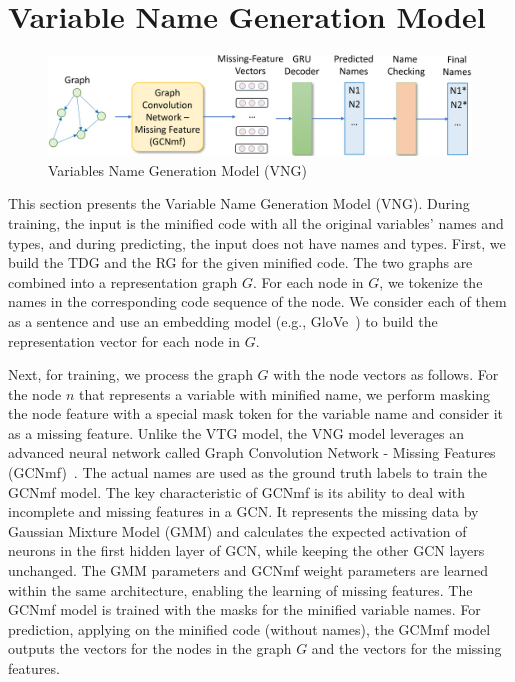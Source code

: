 \section{Variable Name Generation Model}
\label{sec:name-gen}

\begin{figure}[h]
	\begin{center}
	  \includegraphics[width=4.8in]{figures/name-gen-model-2}
          \vspace{-6pt}
		\caption{Variables Name Generation Model (VNG)}
		\label{fig:name-gen}
	\end{center}
\end{figure}


This section presents the Variable Name Generation Model (VNG).
During training, the input is the minified code with all the original
variables' names and types, and during predicting, the input does not
have names and types. First, we build the TDG and the RG for the given
minified code. The two graphs are combined into a representation
graph $G$. For each node in $G$, we tokenize the names in the
corresponding code sequence of the node. We consider each of them as a
sentence and use an embedding model (e.g.,
GloVe~\cite{pennington2014glove}) to build the representation vector
for each node in $G$.

Next, for training, we process the graph $G$ with the node vectors as
follows. For the node $n$ that represents a variable with minified
name, we perform masking the node feature with a special mask token
for the variable name and consider it as a missing feature. Unlike the
VTG model, the VNG model leverages an advanced neural network called
Graph Convolution Network - Missing Features (GCNmf)~\cite{GCNmf}.
The actual names are used as the ground truth labels to train the
GCNmf model. The key characteristic of GCNmf is its ability to deal
with incomplete and missing features in a GCN. It represents the
missing data by Gaussian Mixture Model (GMM) and calculates the
expected activation of neurons in the first hidden layer of GCN, while
keeping the other GCN layers unchanged. The GMM parameters and GCNmf
weight parameters are learned within the same architecture, enabling
the learning of missing features. The GCNmf model is trained with the
masks for the minified variable names. For prediction, applying on the
minified code (without names), the GCMmf model outputs the vectors for
the nodes in the graph $G$ and the vectors for the missing features.

